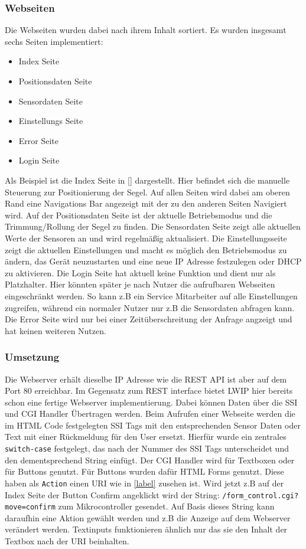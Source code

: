 \subsubsection{Webseiten}
Die Webseiten wurden dabei nach ihrem Inhalt sortiert. Es wurden insgesamt sechs Seiten implementiert:
\begin{itemize}
	\item Index Seite
	\item Positionsdaten Seite
	\item Sensordaten Seite
	\item Einstellungs Seite
	\item Error Seite
	\item Login Seite
\end{itemize}
Als Beispiel ist die Index Seite in \autoref{} dargestellt. Hier befindet sich die manuelle Steuerung zur Positionierung der Segel. Auf allen Seiten wird dabei am oberen Rand eine Navigations Bar angezeigt mit der zu den anderen Seiten Navigiert wird. Auf der Positionsdaten Seite ist der aktuelle Betriebsmodus und die Trimmung/Rollung der Segel zu finden. Die Sensordaten Seite zeigt alle aktuellen Werte der Sensoren an und wird regelmäßig aktualisiert. Die Einstellungsseite zeigt die aktuellen Einstellungen und macht es möglich den Betriebsmodus zu ändern, das Gerät neuzustarten und eine neue IP Adresse festzulegen oder \ac{DHCP} zu aktivieren. Die Login Seite hat aktuell keine Funktion und dient nur als Platzhalter. Hier könnten später je nach Nutzer die aufrufbaren Webseiten eingeschränkt werden. So kann z.B ein Service Mitarbeiter auf alle Einstellungen zugreifen, während ein normaler Nutzer nur z.B die Sensordaten abfragen kann. Die Error Seite wird nur bei einer Zeitüberschreitung der Anfrage angzeigt und hat keinen weiteren Nutzen.
\subsubsection{Umsetzung}
Die Webserver erhält dieselbe \ac{IP} Adresse wie die \ac{REST} \ac{API} ist aber auf dem Port 80 erreichbar. Im Gegensatz zum \ac{REST} interface bietet \ac{LWIP} hier bereits schon eine fertige Webserver implementierung. Dabei können Daten über die \ac{SSI} und \ac{CGI} Handler Übertragen werden. Beim Aufrufen einer Webseite werden die im \ac{HTML} Code festgelegten \ac{SSI} Tags mit den entsprechenden Sensor Daten oder Text mit einer Rückmeldung für den User ersetzt. Hierfür wurde ein zentrales \verb|switch-case| festgelegt, das nach der Nummer des \ac{SSI} Tags unterscheidet und den dementsprechend String einfügt. Der \ac{CGI} Handler wird für Textboxen oder für Buttons genutzt. Für Buttons wurden dafür \ac{HTML} Forms genutzt. Diese haben als \verb|Action| einen \ac{URI} wie in \autoref{label} zusehen ist. Wird jetzt z.B auf der Index Seite der Button \glqq{}Confirm\grqq{} angeklickt wird der String: \verb|/form_control.cgi?move=confirm| zum Mikrocontroller gesendet. Auf Basis dieses String kann daraufhin eine Aktion gewählt werden und z.B die Anzeige auf dem Webserver verändert werden. Textinputs funktionieren ähnlich nur das sie den Inhalt der Textbox nach der \ac{URI} beinhalten.





